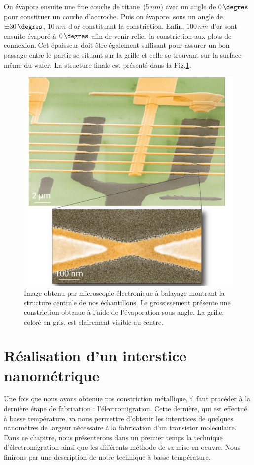 On évapore ensuite une fine couche de titane~(5$\, nm$) avec un angle de $0\,\degres$ pour constituer un couche d'accroche. Puis on évapore, sous un angle de $\pm30\,\degres$, $10\, nm$ d'or  constituant la constriction. Enfin, $100\,nm$ d'or sont ensuite évaporé à $0\,\degres$ afin de venir relier la constriction aux plots de connexion. Cet épaisseur doit être également suffisant pour assurer un bon passage entre le partie se situant sur la grille et celle se trouvant sur la surface même du wafer. La structure finale est présenté dans la Fig.\ref{ZoomFinal}.

\begin{figure}
\centering \includegraphics[scale=0.45]{Fabrication/ZoomFinal/ZoomFinal.pdf}
\caption{Image obtenu par microscopie électronique à balayage montrant la structure centrale de nos échantillons. Le grossissement présente une constriction obtenue à l'aide de l'évaporation sous angle. La grille, coloré en gris, est clairement visible au centre.}
\label{ZoomFinal}
\end{figure}


\section{Réalisation d'un interstice nanométrique}
Une fois que nous avons obtenue nos constriction métallique, il faut procéder à la dernière étape de fabrication : l'électromigration. Cette dernière, qui est effectué à basse température, va nous permettre d'obtenir les interstices de quelques nanomètres de largeur nécessaire à la fabrication d'un transistor moléculaire. Dans ce chapitre, nous présenterons dans un premier temps la technique d'électromigration ainsi que les différents méthode de sa mise en oeuvre. Nous finirons par une description de notre technique à basse température.

